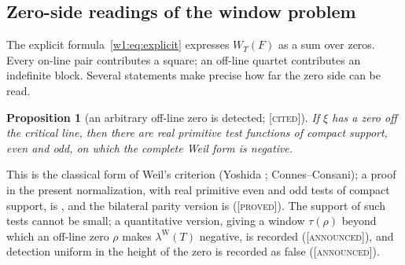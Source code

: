 \documentclass[11pt]{amsart}
\newtheorem{proposition}[theorem]{Proposition}
\theoremstyle{definition}
\theoremstyle{remark}
\numberwithin{equation}{section}
\newcommand{\WT}{W_T}                                  %
\newcommand{\lamW}{\lambda^{\mathrm W}(T)}             %
\newcommand{\stag}[1]{\textsc{[#1]}}
\newcommand{\PROVED}{\stag{proved}}
\newcommand{\CITED}{\stag{cited}}
\newcommand{\ANNOUNCED}{\stag{announced}}
\begin{document}
\subsection{Zero-side readings of the window problem}

The explicit formula~\eqref{w1:eq:explicit} expresses $\WT(F)$ as a sum over zeros. Every on-line
pair contributes a square; an off-line quartet contributes an indefinite block. Several statements
make precise how far the zero side can be read.

\begin{proposition}[an arbitrary off-line zero is detected; \CITED]\label{w6:prop:detect}
If $\xi$ has a zero off the critical line, then there are real primitive test functions of compact
support, even and odd, on which the complete Weil form is negative.
\end{proposition}
This is the classical form of Weil's criterion (Yoshida \cite{Yoshida1992}; Connes--Consani); a proof
in the present normalization, with real primitive even and odd tests of compact support, is
\cite[Theorem~6.2]{P45}, and the bilateral parity version is \cite[Theorem~13.2]{P39} (\PROVED). The
support of such tests cannot be small; a quantitative version, giving a window $\tau(\rho)$ beyond
which an off-line zero $\rho$ makes $\lamW$ negative, is recorded (\ANNOUNCED), and detection
uniform in the height of the zero is recorded as false (\ANNOUNCED).
\end{document}
